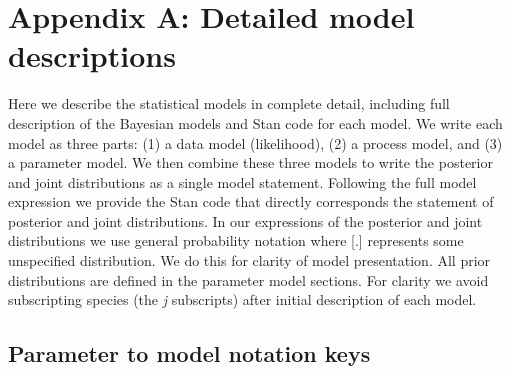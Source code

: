 \documentclass[12pt,]{article}
\author{}
\date{}
\begin{document}
\normalsize


\renewcommand\thefigure{A\arabic{figure}}  

\section{Appendix A: Detailed model
descriptions}\label{appendix-a-detailed-model-descriptions}

Here we describe the statistical models in complete detail, including
full description of the Bayesian models and Stan code for each model. We
write each model as three parts: (1) a data model (likelihood), (2) a
process model, and (3) a parameter model. We then combine these three
models to write the posterior and joint distributions as a single model
statement. Following the full model expression we provide the Stan code
that directly corresponds the statement of posterior and joint
distributions. In our expressions of the posterior and joint
distributions we use general probability notation where {[}.{]}
represents some unspecified distribution. We do this for clarity of
model presentation. All prior distributions are defined in the parameter
model sections. For clarity we avoid subscripting species (the \emph{j}
subscripts) after initial description of each model.

\subsection{Parameter to model notation
keys}\label{parameter-to-model-notation-keys}
\end{document}
